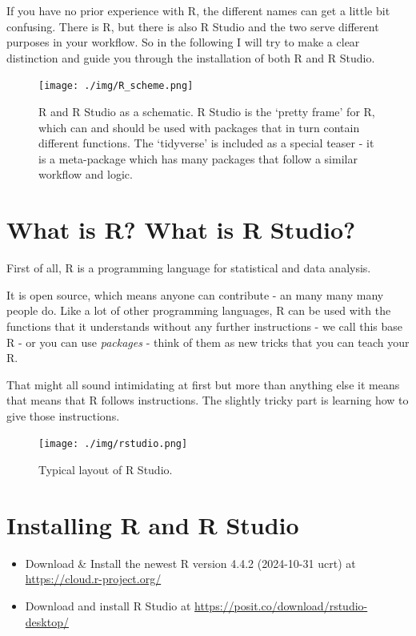 \documentclass[
]{book}
\providecommand{\tightlist}{%
  \setlength{\itemsep}{0pt}\setlength{\parskip}{0pt}}
\begin{document}
If you have no prior experience with R, the different names can get a little bit confusing.
There is R, but there is also R Studio and the two serve different purposes in your workflow.
So in the following I will try to make a clear distinction and guide you through the installation of both R and R Studio.

\begin{figure}
\centering
\texttt{[image: ./img/R\_scheme.png]}
\caption{\label{fig:scheme}R and R Studio as a schematic. R Studio is the `pretty frame' for R, which can and should be used with packages that in turn contain different functions. The `tidyverse' is included as a special teaser - it is a meta-package which has many packages that follow a similar workflow and logic.}
\end{figure}

\section{What is R? What is R Studio?}\label{what-is-r-what-is-r-studio}

First of all, R is a programming language for statistical and data analysis.

It is open source, which means anyone can contribute - an many many many people do.
Like a lot of other programming languages, R can be used with the functions that it understands without any further instructions - we call this base R - or you can use \emph{packages} - think of them as new tricks that you can teach your R.

That might all sound intimidating at first but more than anything else it means that means that R follows instructions.
The slightly tricky part is learning how to give those instructions.

\begin{figure}
\centering
\texttt{[image: ./img/rstudio.png]}
\caption{\label{fig:rstudio}Typical layout of R Studio.}
\end{figure}

\section{Installing R and R Studio}\label{installing-r-and-r-studio}

\begin{itemize}
\tightlist
\item
  Download \& Install the newest R version 4.4.2 (2024-10-31 ucrt) at \url{https://cloud.r-project.org/}
\item
  Download and install R Studio at \url{https://posit.co/download/rstudio-desktop/}
\end{itemize}
\end{document}

